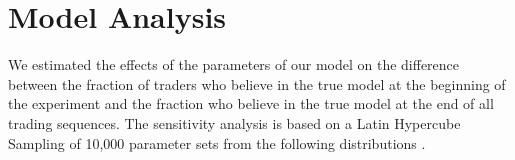 \documentclass{article}\usepackage[]{graphicx}\usepackage[]{color}
\begin{document}
% 
% 	
% 	
% 

\section*{Model Analysis}
	
We estimated the effects of the parameters of our model on the difference between the fraction of traders who believe in the true model at the beginning of the experiment and the fraction who believe in the true model at the end of all trading sequences. The sensitivity analysis is based on a Latin Hypercube Sampling of 10,000 parameter sets from the following distributions \cite{beachkofski_improved_2002,carnell_lhs_2012}. 
\end{document}
